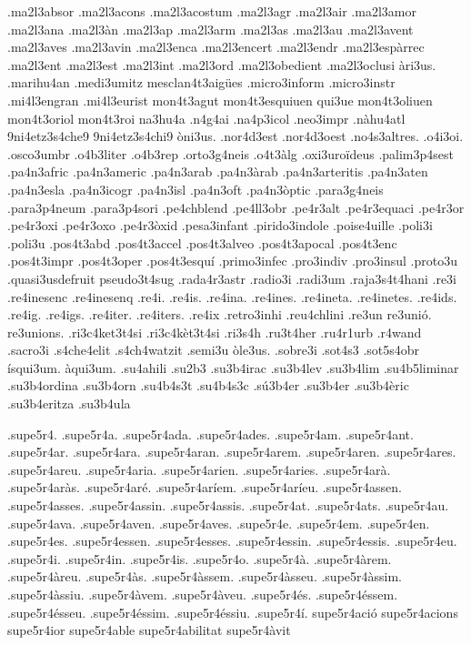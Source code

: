 {.ma2l3absor
.ma2l3acons
.ma2l3acostum
.ma2l3agr
.ma2l3air
.ma2l3amor
.ma2l3ana
.ma2l3àn
.ma2l3ap
.ma2l3arm
.ma2l3as
.ma2l3au
.ma2l3avent
.ma2l3aves
.ma2l3avin
.ma2l3enca
.ma2l3encert
.ma2l3endr
.ma2l3espàrrec
.ma2l3ent
.ma2l3est
.ma2l3int
.ma2l3ord
.ma2l3obedient
.ma2l3oclusi
àri3us.
.marihu4an
.medi3umitz
mesclan4t3aigües
.micro3inform
.micro3instr
.mi4l3engran
.mi4l3eurist
mon4t3agut
mon4t3esquiuen
qui3ue
mon4t3oliuen
mon4t3oriol
mon4t3roi 
na3hu4a
.n4g4ai
.na4p3icol
.neo3impr
.nàhu4atl
9ni4etz3s4che9
9ni4etz3s4chi9
òni3us.
.nor4d3est
.nor4d3oest
.no4s3altres.
.o4i3oi.
.osco3umbr
.o4b3liter
.o4b3rep
.orto3g4neis
.o4t3àlg
.oxi3uroïdeus
.palim3p4sest
.pa4n3afric
.pa4n3americ
.pa4n3arab
.pa4n3àrab
.pa4n3arteritis
.pa4n3aten
.pa4n3esla
.pa4n3icogr
.pa4n3isl
.pa4n3oft
.pa4n3òptic
.para3g4neis
.para3p4neum
.para3p4sori
.pe4chblend
.pe4ll3obr
.pe4r3alt
.pe4r3equaci
.pe4r3or
.pe4r3oxi
.pe4r3oxo
.pe4r3òxid
.pesa3infant
.pirido3indole
.poise4uille
.poli3i
.poli3u
.pos4t3abd
.pos4t3accel
.pos4t3alveo
.pos4t3apocal
.pos4t3enc
.pos4t3impr
.pos4t3oper
.pos4t3esquí
.primo3infec
.pro3indiv
.pro3insul
.proto3u
.quasi3usdefruit
pseudo3t4sug
.rada4r3astr
.radio3i
.radi3um
.raja3s4t4hani
.re3i
.re4inesenc
.re4inesenq
.re4i.
.re4is.
.re4ina.
.re4ines.
.re4ineta.
.re4inetes.
.re4ids.
.re4ig.
.re4igs.
.re4iter. 
.re4iters.
.re4ix
.retro3inhi
.reu4chlini
.re3un
re3unió.
re3unions.
.ri3c4ket3t4si
.ri3c4kèt3t4si
.ri3s4h
.ru3t4her
.ru4r1urb
.r4wand
.sacro3i
.s4che4elit
.s4ch4watzit
.semi3u
òle3us.
.sobre3i
.sot4s3
.sot5s4obr
ísqui3um.
àqui3um.
.su4ahili
.su2b3
.su3b4irac
.su3b4lev
.su3b4lim
.su4b5liminar
.su3b4ordina
.su3b4orn
.su4b4s3t
.su4b4s3c
.sú3b4er
.su3b4er
.su3b4èric
.su3b4eritza
.su3b4ula

.supe5r4.
.supe5r4a.
.supe5r4ada.
.supe5r4ades.
.supe5r4am.
.supe5r4ant.
.supe5r4ar.
.supe5r4ara.
.supe5r4aran.
.supe5r4arem.
.supe5r4aren.
.supe5r4ares.
.supe5r4areu.
.supe5r4aria.
.supe5r4arien.
.supe5r4aries.
.supe5r4arà.
.supe5r4aràs.
.supe5r4aré.
.supe5r4aríem.
.supe5r4aríeu.
.supe5r4assen.
.supe5r4asses.
.supe5r4assin.
.supe5r4assis.
.supe5r4at.
.supe5r4ats.
.supe5r4au.
.supe5r4ava.
.supe5r4aven.
.supe5r4aves.
.supe5r4e.
.supe5r4em.
.supe5r4en.
.supe5r4es.
.supe5r4essen.
.supe5r4esses.
.supe5r4essin.
.supe5r4essis.
.supe5r4eu.
.supe5r4i.
.supe5r4in.
.supe5r4is.
.supe5r4o.
.supe5r4à.
.supe5r4àrem.
.supe5r4àreu.
.supe5r4às.
.supe5r4àssem.
.supe5r4àsseu.
.supe5r4àssim.
.supe5r4àssiu.
.supe5r4àvem.
.supe5r4àveu.
.supe5r4és.
.supe5r4éssem.
.supe5r4ésseu.
.supe5r4éssim.
.supe5r4éssiu.
.supe5r4í.
supe5r4ació
supe5r4acions
supe5r4ior
supe5r4able
supe5r4abilitat
supe5r4àvit

}
